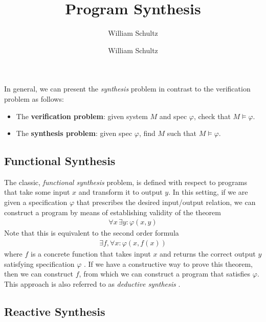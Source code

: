 \documentclass[10pt,a4paper]{article}
\author{William Schultz}
\begin{document}
\title{Program Synthesis}
\author{William Schultz}
\maketitle


In general, we can present the \textit{synthesis} problem in contrast to the verification problem as follows:
\begin{itemize}
    \item The \textbf{verification problem}: given system $M$ and spec $\varphi$, check that $M \vDash \varphi$.
    \item The \textbf{synthesis problem}: given spec $\varphi$, find $M$ such that $M \vDash \varphi$.
\end{itemize}

\subsection{Functional Synthesis}

The classic, \textit{functional synthesis} problem, is defined with respect to programs that take some input $x$ and transform it to output $y$. In this setting, if we are given a specification $\varphi$ that prescribes the desired input/output relation, we can construct a program by means of establishing validity of the theorem
\begin{align*}
    \forall x \, \exists y : \varphi(x,y)
\end{align*}
Note that this is equivalent to the second order formula
\begin{align*}
    \exists f, \forall x : \varphi(x,f(x))
\end{align*}
where $f$ is a concrete function that takes input $x$ and returns the correct output $y$ satisfying specification $\varphi$ \cite{1989pnuelirosner,1969waldingersynthprow}. If we have a constructive way to prove this theorem, then we can construct $f$, from which we can construct a program that satisfies $\varphi$. This approach is also referred to as \textit{deductive synthesis} \cite{manna1980deductive}.

\subsection{Reactive Synthesis}
\end{document}
